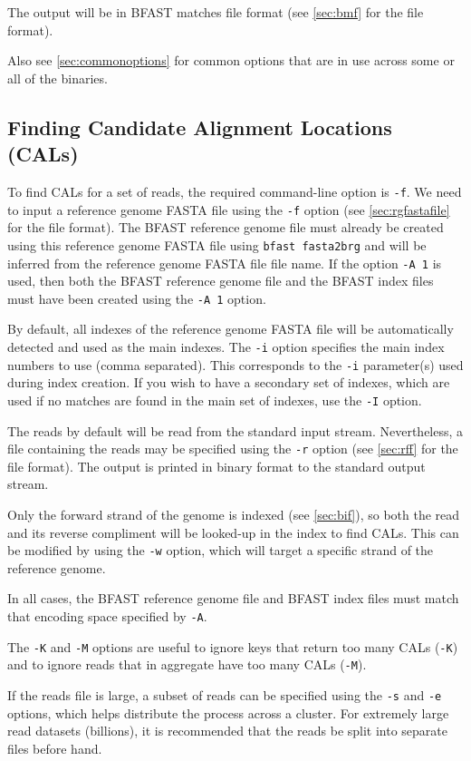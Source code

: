 \documentclass[a4paper,12pt]{book}
\newcommand{\TT}[1]{{\tt #1}} %
\newcommand{\rGFF}{reference genome FASTA file}
\newcommand{\BRGF}{BFAST reference genome file} %
\newcommand{\BIF}{BFAST index file} %
\newcommand{\BMF}{BFAST matches file} %
\begin{document}
The output will be in \BMF{} format (see \autoref{sec:bmf} for the file format).

Also see \autoref{sec:commonoptions} for common options that are in use across some or all of the binaries.
\subsection{Finding Candidate Alignment Locations (CALs)}
\label{sec:finding-cals}
To find CALs for a set of reads, the required command-line option is \TT{-f}.
We need to input a \rGFF{} using the \TT{-f} option (see \autoref{sec:rgfastafile} for the file format).
The \BRGF{} must already be created using this \rGFF{} using \TT{bfast fasta2brg} and will be inferred from the \rGFF{} file name.
If the option \TT{-A 1} is used, then both the \BRGF{} and the \BIF{s} must have been created using the \TT{-A 1} option.

By default, all indexes of the \rGFF{} will be automatically detected and used as the main indexes.
The \TT{-i} option specifies the main index numbers to use (comma separated).
This corresponds to the \TT{-i} parameter(s) used during index creation.
If you wish to have a secondary set of indexes, which are used if no matches are found in the main set of indexes, use the \TT{-I} option.

The reads by default will be read from the standard input stream.
Nevertheless, a file containing the reads may be specified using the \TT{-r} option (see \autoref{sec:rff} for the file format).
The output is printed in binary format to the standard output stream.

Only the forward strand of the genome is indexed (see \autoref{sec:bif}), so both the read and its reverse compliment will be looked-up in the index to find CALs.  
This can be modified by using the \TT{-w} option, which will target a specific strand of the reference genome.

In all cases, the \BRGF{} and \BIF{s} must match that encoding space specified by \TT{-A}.

The \TT{-K} and \TT{-M} options are useful to ignore keys that return too many CALs (\TT{-K}) and to ignore reads that in aggregate have too many CALs (\TT{-M}).

If the reads file is large, a subset of reads can be specified using the \TT{-s} and \TT{-e} options, which helps distribute the process across a cluster.
For extremely large read datasets (billions), it is recommended that the reads be split into separate files before hand.
\end{document}
